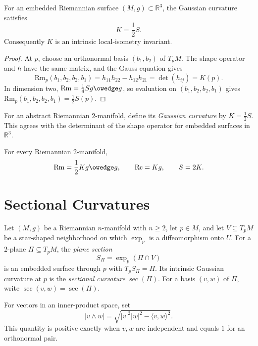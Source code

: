 \begin{theorem}
\label{thm:theorema-egregium}
For an embedded Riemannian surface $(M,g)\subset\mathbb R^3$, the Gaussian
curvature satisfies
\[
K=\frac12S.
\]
Consequently $K$ is an intrinsic local-isometry invariant.
\end{theorem}

\begin{proof}
\sketch
At $p$, choose an orthonormal basis $(b_1,b_2)$ of $T_pM$.  The shape
operator and $h$ have the same matrix, and the Gauss equation gives
\[
\mathrm{Rm}_p(b_1,b_2,b_2,b_1)
=h_{11}h_{22}-h_{12}h_{21}=\det(h_{ij})=K(p).
\]
In dimension two,
$\mathrm{Rm}=\tfrac14Sg\owedge g$, so evaluation on
$(b_1,b_2,b_2,b_1)$ gives $\mathrm{Rm}_p(b_1,b_2,b_2,b_1)=\tfrac12S(p)$.
\end{proof}

For an abstract Riemannian $2$-manifold, define its \emph{Gaussian curvature}
by $K=\tfrac12S$.  This agrees with the determinant of the shape operator for
embedded surfaces in $\mathbb R^3$.

\begin{corollary}
\label{cor:riemann-two-manifold-curvatures}
For every Riemannian $2$-manifold,
\[
\mathrm{Rm}=\frac12K g\owedge g,
\qquad
\mathrm{Rc}=Kg,
\qquad
S=2K.
\]
\end{corollary}

\section{Sectional Curvatures}

Let $(M,g)$ be a Riemannian $n$-manifold with $n\geq2$, let $p\in M$, and
let $V\subseteq T_pM$ be a star-shaped neighborhood on which $\exp_p$ is a
diffeomorphism onto $U$.  For a $2$-plane $\Pi\subseteq T_pM$, the
\emph{plane section}
\[
S_\Pi=\exp_p(\Pi\cap V)
\]
is an embedded surface through $p$ with $T_pS_\Pi=\Pi$.  Its intrinsic
Gaussian curvature at $p$ is the \emph{sectional curvature} $\sec(\Pi)$.
For a basis $(v,w)$ of $\Pi$, write $\sec(v,w)=\sec(\Pi)$.

For vectors in an inner-product space, set
\begin{equation}
|v\wedge w|=\sqrt{|v|^2|w|^2-\langle v,w\rangle^2}. \tag{8.27}
\end{equation}
This quantity is positive exactly when $v,w$ are independent and equals $1$
for an orthonormal pair.

